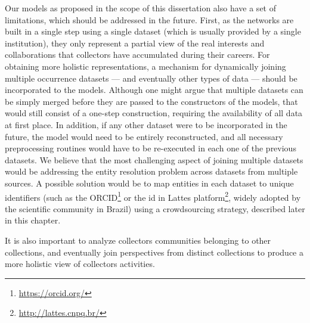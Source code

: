 Our models as proposed in the scope of this dissertation also have a set of limitations, which should be addressed in the future.
First, as the networks are built in a single step using a single dataset (which is usually provided by a single institution), they only represent a partial view of the real interests and collaborations that collectors have accumulated during their careers.
For obtaining more holistic representations, a mechanism for dynamically joining multiple occurrence datasets --- and eventually other types of data --- should be incorporated to the models.
Although one might argue that multiple datasets can be simply merged before they are passed to the constructors of the models, that would still consist of a one-step construction, requiring the availability of all data at first place.
In addition, if any other dataset were to be incorporated in the future, the model would need to be entirely reconstructed, and all necessary preprocessing routines would have to be re-executed in each one of the previous datasets.
%
We believe that the most challenging aspect of joining multiple datasets would be addressing the entity resolution problem across datasets from multiple sources. A possible solution would be to map entities in each dataset to unique identifiers (such as the ORCID\footnote{\url{https://orcid.org/}} or the id in Lattes platform\footnote{\url{http://lattes.cnpq.br/}}, widely adopted by the scientific community in Brazil) using a crowdsourcing strategy, described later in this chapter.












It is also important to analyze collectors communities belonging to other collections, and eventually join perspectives from distinct collections to produce a more holistic view of collectors activities.




